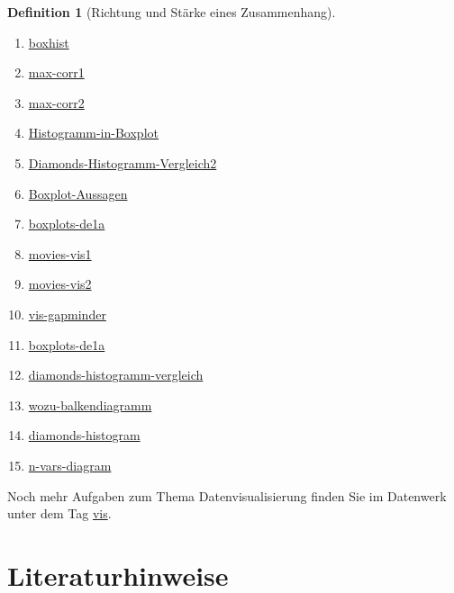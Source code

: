 \documentclass[
  a4paper,
  DIV=11]{scrreprt}
\providecommand{\tightlist}{%
  \setlength{\itemsep}{0pt}\setlength{\parskip}{0pt}}\usepackage{longtable,booktabs,array}
\theoremstyle{definition}
\theoremstyle{definition}
\theoremstyle{definition}
\newtheorem{definition}{Definition}[chapter]
\theoremstyle{remark}
\begin{document}
\begin{definition}[Richtung und Stärke eines
Zusammenhang]
\begin{enumerate}
\def\labelenumi{\arabic{enumi}.}
\tightlist
\item
  \href{https://datenwerk.netlify.app/posts/boxhist/boxhist.html}{boxhist}
\item
  \href{https://datenwerk.netlify.app/posts/max-corr1/max-corr1.html}{max-corr1}
\item
  \href{https://datenwerk.netlify.app/posts/max-corr2/max-corr2.html}{max-corr2}
\item
  \href{https://datenwerk.netlify.app/posts/histogramm-in-boxplot/histogramm-in-boxplot}{Histogramm-in-Boxplot}
\item
  \href{https://datenwerk.netlify.app/posts/diamonds-histogramm-vergleich2/diamonds-histogramm-vergleich2}{Diamonds-Histogramm-Vergleich2}
\item
  \href{https://datenwerk.netlify.app/posts/boxplot-aussagen/boxplot-aussagen}{Boxplot-Aussagen}
\item
  \href{https://datenwerk.netlify.app/posts/boxplots-de1a/boxplots-de1a.html}{boxplots-de1a}
\item
  \href{https://datenwerk.netlify.app/posts/movies-vis1/movies-vis1.html}{movies-vis1}
\item
  \href{https://datenwerk.netlify.app/posts/movies-vis2/movies-vis2.html}{movies-vis2}
\item
  \href{https://datenwerk.netlify.app/posts/vis-gapminder/vis-gapminder}{vis-gapminder}
\item
  \href{https://datenwerk.netlify.app/posts/boxplots-de1a/boxplots-de1a}{boxplots-de1a}
\item
  \href{https://datenwerk.netlify.app/posts/diamonds-histogramm-vergleich/diamonds-histogramm-vergleich}{diamonds-histogramm-vergleich}
\item
  \href{https://datenwerk.netlify.app/posts/wozu-balkendiagramm/wozu-balkendiagramm}{wozu-balkendiagramm}
\item
  \href{https://datenwerk.netlify.app/posts/diamonds-histogram/diamonds-histogram}{diamonds-histogram}
\item
  \href{https://datenwerk.netlify.app/posts/n-vars-diagram/n-vars-diagram}{n-vars-diagram}
\end{enumerate}

Noch mehr Aufgaben zum Thema Datenvisualisierung finden Sie im Datenwerk
unter dem Tag \href{https://datenwerk.netlify.app/\#category=vis}{vis}.

\section{Literaturhinweise}\label{literaturhinweise-3}


\end{definition}
\end{document}
